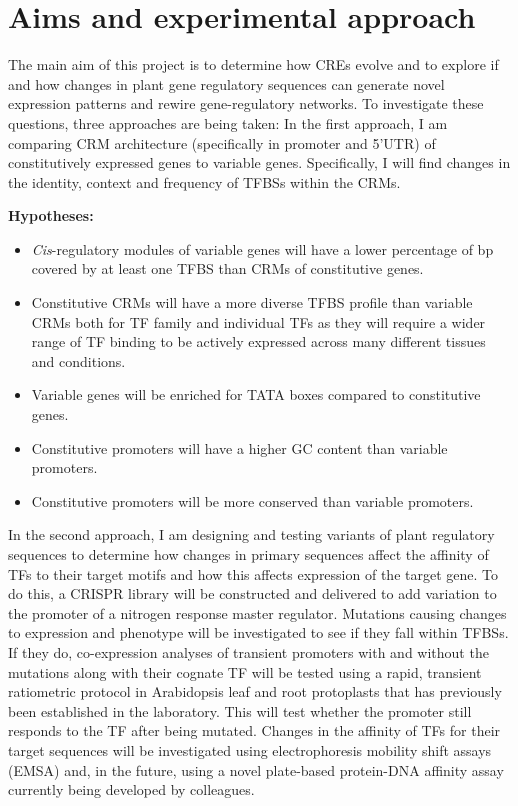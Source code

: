 \documentclass[../main.tex]{subfiles}
\begin{document}
\section{Aims and experimental approach}\label{chapter1:aims-and-experimental-approach}
The main aim of this project is to determine how CREs evolve and to explore if and how changes in plant gene regulatory sequences can generate novel expression patterns and rewire gene\hyp{}regulatory networks.
To investigate these questions, three approaches are being taken:
In the first approach, I am comparing CRM architecture (specifically in
promoter and 5'UTR) of constitutively expressed genes to variable genes.
Specifically, I will find changes in the identity, context and frequency
of TFBSs within the CRMs.

\textbf{Hypotheses:}

\begin{itemize}
	\tightlist
	\item \textit{Cis}\hyp{}regulatory modules of variable genes will have a lower percentage of bp covered by at least one TFBS than CRMs of constitutive genes.
	\item Constitutive CRMs will have a more diverse TFBS profile than variable CRMs both for TF family and individual TFs as they will require a wider range of TF binding to be actively expressed across many different tissues and conditions.
	\item Variable genes will be enriched for TATA boxes compared to constitutive genes.
	\item Constitutive promoters will have a higher GC content than variable promoters.
	\item Constitutive promoters will be more conserved than variable promoters.
\end{itemize}

In the second approach, I am designing and testing variants of plant regulatory sequences to determine how changes in primary sequences affect the affinity of TFs to their target motifs and how this affects expression of the target gene.
To do this, a CRISPR library will be constructed and delivered to add variation to the promoter of a nitrogen response master regulator.
Mutations causing changes to expression and phenotype will be investigated to see if they fall within TFBSs.
If they do, co\hyp{}expression analyses of transient promoters with and without the mutations along with their cognate TF will be tested using a rapid, transient ratiometric protocol in Arabidopsis leaf and root protoplasts that has previously been established in the laboratory.
This will test whether the promoter still responds to the TF after being mutated.
Changes in the affinity of TFs for their target sequences will be investigated using electrophoresis mobility shift assays (EMSA) and, in the future, using a novel plate\hyp{}based protein\hyp{}DNA affinity assay currently being developed by colleagues.
\end{document}
